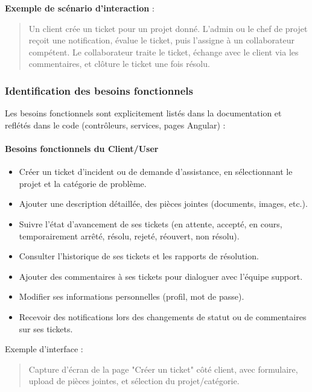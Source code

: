 \textbf{Exemple de scénario d'interaction} :
\begin{quote}
    Un client crée un ticket pour un projet donné. L'admin ou le chef de projet reçoit une notification, évalue le ticket, puis l'assigne à un collaborateur compétent. Le collaborateur traite le ticket, échange avec le client via les commentaires, et clôture le ticket une fois résolu.
\end{quote}

\subsubsection{Identification des besoins fonctionnels}
\label{sec:identification-des-besoins-fonctionnels}
Les besoins fonctionnels sont explicitement listés dans la documentation et reflétés dans le code (contrôleurs, services, pages Angular) :

\paragraph{Besoins fonctionnels du Client/User}
\label{sec:besoins-fonctionnels-client}
\begin{itemize}
    \item Créer un ticket d'incident ou de demande d'assistance, en sélectionnant le projet et la catégorie de problème.
    \item Ajouter une description détaillée, des pièces jointes (documents, images, etc.).
    \item Suivre l'état d'avancement de ses tickets (en attente, accepté, en cours, temporairement arrêté, résolu, rejeté, réouvert, non résolu).
    \item Consulter l'historique de ses tickets et les rapports de résolution.
    \item Ajouter des commentaires à ses tickets pour dialoguer avec l'équipe support.
    \item Modifier ses informations personnelles (profil, mot de passe).
    \item Recevoir des notifications lors des changements de statut ou de commentaires sur ses tickets.
\end{itemize}

Exemple d'interface :
\begin{quote}
    Capture d'écran de la page "Créer un ticket" côté client, avec formulaire, upload de pièces jointes, et sélection du projet/catégorie.
\end{quote}

